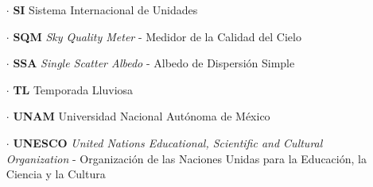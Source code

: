 \begin{itemize}
\item[$\cdot$] \textbf{SI} Sistema Internacional de Unidades

\item[$\cdot$] \textbf{SQM} \textit{Sky Quality Meter} - Medidor de la Calidad del Cielo

\item[$\cdot$] \textbf{SSA} \textit{Single Scatter Albedo} - Albedo de Dispersión Simple

\item[$\cdot$] \textbf{TL} Temporada Lluviosa

\item[$\cdot$] \textbf{UNAM} Universidad Nacional Autónoma de México

\item[$\cdot$] \textbf{UNESCO} \textit{United Nations Educational, Scientific and Cultural Organization} - Organización de las Naciones Unidas para la Educación, la Ciencia y la Cultura
			
\end{itemize}
